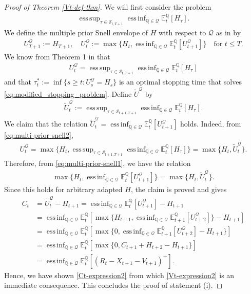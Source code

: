 \documentclass[11pt,a4paper]{article}
\newcommand{\E}{\mathbb{E}}
\DeclareMathOperator*{\esssup}{ess\,sup}
\DeclareMathOperator*{\essinf}{ess\,inf}
\newcommand{\Q}{\mathbb{Q}}
\newcommand{\calS}{\mathcal{S}}
\newcommand{\calQ}{\mathcal{Q}}
\begin{document}
\begin{proof}[Proof of Theorem \ref{Vt-def-thm}]
We will first consider the problem
\begin{align}
\esssup_{\tau \in \calS_{t,T+1}}\essinf_{\Q \in \calQ}\E_t^\Q[H_\tau]. \label{eq:modified_stopping_problem}
\end{align}
We define the multiple prior Snell envelope of $H$ with respect to $\calQ$ as in \cite{Riedel-09} by 
\begin{align}\label{eq:multi-prior-snell1}
U^\calQ_{T+1} := H_{T+1},\quad
U^\calQ_t :=\max\big\{H_t, \essinf_{\Q \in \calQ}\E_t^\Q[U^\calQ_{t+1}]\big\} \quad \text{for } t\leq T.
\end{align}
We know from Theorem 1 in \cite{Riedel-09} that 
\begin{align}\label{eq:multi-prior-snell2}
U^\calQ_{t} = \esssup_{\tau \in \calS_{t,T+1}}\essinf_{\Q \in \calQ}\E_t^\Q[H_\tau]
\end{align}
and that $\tau^*_t := \inf\{s \geq t  : U^{\calQ}_s = H_s\}$ is an optimal stopping time that solves \eqref{eq:modified_stopping_problem}. Define $\widetilde{U}^{\calQ}$ by 
\begin{align*}
\widetilde{U}^{\calQ}_t := \esssup_{\tau \in \calS_{t+1,T+1}}\essinf_{\Q \in \calQ}\E_t^\Q[H_\tau].
\end{align*}
We claim that the relation $\widetilde{U}^{\calQ}_t = \essinf_{\Q \in \calQ}\E_t^\Q[U^\calQ_{t+1}]$ holds.  
Indeed, from \eqref{eq:multi-prior-snell2},
\begin{align*}
U^\calQ_{t} = \max\big\{H_{t},\esssup_{\tau \in \calS_{t+1,T+1}}\essinf_{\Q \in \calQ}\E_t^\Q[H_\tau]\big\}
= \max\big\{H_{t},\widetilde{U}^{\calQ}_t\big\}.
\end{align*}
Therefore, from \eqref{eq:multi-prior-snell1}, we have the relation
\begin{align*}
\max\big\{H_t, \essinf_{\Q \in \calQ}\E_t^\Q[U^\calQ_{t+1}]\big\}=\max\big\{H_{t},\widetilde{U}^{\calQ}_t\big\}.
\end{align*} 
Since this holds for arbitrary adapted $H$, the claim is proved and gives
\begin{align*}
C_t &= \widetilde{U}^{\calQ}_t -H_{t+1} =\essinf_{\Q \in \calQ}\E_t^\Q[U^\calQ_{t+1}] -H_{t+1} \\
&= \essinf_{\Q \in \calQ}\E_t^\Q[ \max\{H_{t+1},\essinf_{\Q \in \calQ}\E_{t+1}^\Q[U^\calQ_{t+2}]\}-H_{t+1}]\\
&= \essinf_{\Q \in \calQ}\E_t^\Q[ \max\{0,\essinf_{\Q \in \calQ}\E_{t+1}^\Q[U^\calQ_{t+2}]-H_{t+1}\}]\\
&= \essinf_{\Q \in \calQ}\E_t^\Q[ \max\{0,C_{t+1} + H_{t+2} - H_{t+1}\}]\\
&= \essinf_{\Q \in \calQ}\E_t^\Q[ (R_t - X_{t+1}- V_{t+1})^+].
\end{align*}
Hence, we have shown \eqref{Ct-expression2} from which \eqref{Vt-expression2} is an immediate consequence. This concludes the proof of statement (i). 
\end{proof}
\end{document}

